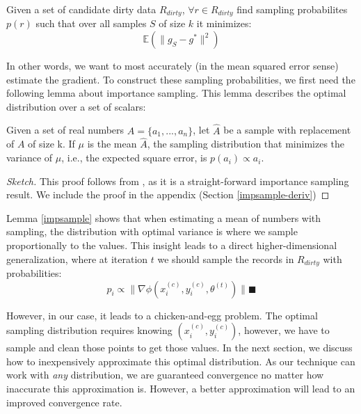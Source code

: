 \begin{definition}
Given a set of candidate dirty data $R_{dirty}$, $\forall r \in R_{dirty}$ find sampling probabilites $p(r)$ such that over all samples $S$ of size $k$ it minimizes:
\[
\mathbb{E}(\|g_S - g^*\|^2)
\]
\end{definition}
In other words, we want to most accurately (in the mean squared error sense) estimate the gradient. 
To construct these sampling probabilities, we first need the following lemma about importance sampling.
This lemma describes the optimal distribution over a set of scalars:
\begin{lemma}\label{impsample}
Given a set of real numbers $A = \{a_1,...,a_n\}$, let $\hat{A}$ be 
a sample with replacement of $A$ of size k.
If $\mu$ is the mean $\hat{A}$, the sampling distribution that minimizes
 the variance of $\mu$, i.e., the expected square error, is $p(a_i) \propto a_i$.
\end{lemma}
\begin{proof}[Sketch]
This proof follows from \cite{mcbook}, as it is a straight-forward importance sampling result.
We include the proof in the appendix (Section \ref{impsample-deriv})
\end{proof}

Lemma \ref{impsample} shows that when estimating a mean of numbers with sampling, the distribution with optimal variance is where we sample proportionally to the values.
This insight leads to a direct higher-dimensional generalization, where at iteration $t$ we should sample the records in $R_{dirty}$ with probabilities:
\[
p_i \propto \|\nabla\phi(x^{(c)}_i,y^{(c)}_i,\theta^{(t)})\| \blacksquare
\]

However, in our case, it leads to a chicken-and-egg problem.
The optimal sampling distribution requires knowing $(x^{(c)}_i,y^{(c)}_i)$, however, we have to sample and clean those points to get those values.
In the next section, we discuss how to inexpensively approximate this optimal distribution.
As our technique can work with \emph{any} distribution, we are guaranteed convergence no matter how inaccurate this approximation is.
However, a better approximation will lead to an improved convergence rate.
